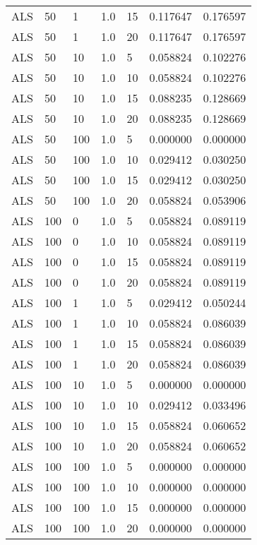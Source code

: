 \begin{tabular}{lllrlrr}
       ALS &   50 &     1 &   1.0 &   15 &     0.117647 &  0.176597 \\
       ALS &   50 &     1 &   1.0 &   20 &     0.117647 &  0.176597 \\
       ALS &   50 &    10 &   1.0 &    5 &     0.058824 &  0.102276 \\
       ALS &   50 &    10 &   1.0 &   10 &     0.058824 &  0.102276 \\
       ALS &   50 &    10 &   1.0 &   15 &     0.088235 &  0.128669 \\
       ALS &   50 &    10 &   1.0 &   20 &     0.088235 &  0.128669 \\
       ALS &   50 &   100 &   1.0 &    5 &     0.000000 &  0.000000 \\
       ALS &   50 &   100 &   1.0 &   10 &     0.029412 &  0.030250 \\
       ALS &   50 &   100 &   1.0 &   15 &     0.029412 &  0.030250 \\
       ALS &   50 &   100 &   1.0 &   20 &     0.058824 &  0.053906 \\
       ALS &  100 &     0 &   1.0 &    5 &     0.058824 &  0.089119 \\
       ALS &  100 &     0 &   1.0 &   10 &     0.058824 &  0.089119 \\
       ALS &  100 &     0 &   1.0 &   15 &     0.058824 &  0.089119 \\
       ALS &  100 &     0 &   1.0 &   20 &     0.058824 &  0.089119 \\
       ALS &  100 &     1 &   1.0 &    5 &     0.029412 &  0.050244 \\
       ALS &  100 &     1 &   1.0 &   10 &     0.058824 &  0.086039 \\
       ALS &  100 &     1 &   1.0 &   15 &     0.058824 &  0.086039 \\
       ALS &  100 &     1 &   1.0 &   20 &     0.058824 &  0.086039 \\
       ALS &  100 &    10 &   1.0 &    5 &     0.000000 &  0.000000 \\
       ALS &  100 &    10 &   1.0 &   10 &     0.029412 &  0.033496 \\
       ALS &  100 &    10 &   1.0 &   15 &     0.058824 &  0.060652 \\
       ALS &  100 &    10 &   1.0 &   20 &     0.058824 &  0.060652 \\
       ALS &  100 &   100 &   1.0 &    5 &     0.000000 &  0.000000 \\
       ALS &  100 &   100 &   1.0 &   10 &     0.000000 &  0.000000 \\
       ALS &  100 &   100 &   1.0 &   15 &     0.000000 &  0.000000 \\
       ALS &  100 &   100 &   1.0 &   20 &     0.000000 &  0.000000 \\
\bottomrule
\end{tabular}
